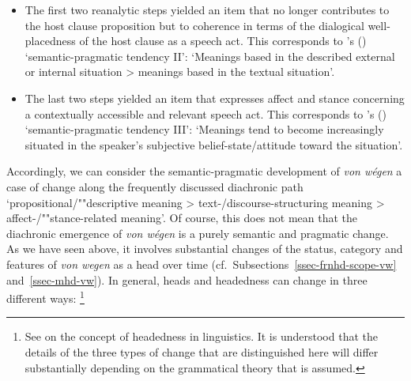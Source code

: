 \documentclass[output=paper
  ,nobabel
  ,draftmode
  ,babelshorthands
  ,colorlinks, citecolor=brown
]{langscibook}
\begin{document}
\begin{itemize}
    \item The first two reanalytic steps yielded an item that no longer contributes to the host clause proposition but to coherence in terms of the dialogical well-placedness of the host clause as a speech act. This corresponds to \citeauthor{TraugottKoenig1991}'s (\citeyear[208]{TraugottKoenig1991}) `semantic-pragmatic tendency II': `Meanings based in the described external or internal situation > meanings based in the textual situation'.
    
    \item The last two steps yielded an item that expresses affect and stance concerning a contextually accessible and relevant speech act. This corresponds to \citeauthor{TraugottKoenig1991}'s (\citeyear[209]{TraugottKoenig1991}) `semantic-pragmatic tendency III': `Meanings tend to become increasingly situated in the speaker’s subjective belief-state/attitude toward the situation'.
\end{itemize}

\noindent
Accordingly, we can consider the semantic-pragmatic development of \emph{von wégen} a case of change
along the frequently discussed diachronic path `propositional/""descriptive meaning >
text-/discourse\hyp structuring meaning > affect-/""stance\hyp related meaning'. Of course, this does not mean that the diachronic emergence of \emph{von wégen} is a purely semantic and pragmatic change. As we have seen above, it involves substantial changes of the status, category and features of \emph{von wegen} as a head over time (cf.\ Subsections~\ref{ssec-frnhd-scope-vw} and~\ref{ssec-mhd-vw}). In general, heads and headedness can change in three different ways:%
\footnote{See \citet{Zwicky:1985:heads,Zwicky1993,Hudson1987,Croft1996} on the concept of headedness in linguistics. It is understood that the details of the three types of change that are distinguished here will differ substantially depending on the grammatical theory that is assumed.}
\end{document}
